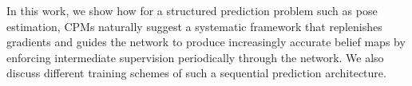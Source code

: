 \documentclass[10pt,twocolumn,letterpaper]{article}
\begin{document}
In this work, we show how for a structured prediction problem such as pose estimation, CPMs naturally suggest a systematic framework that replenishes gradients and guides the network to produce increasingly accurate belief maps  by enforcing intermediate supervision periodically through the network. We also discuss different training schemes of such a sequential prediction architecture. 
\end{document}
